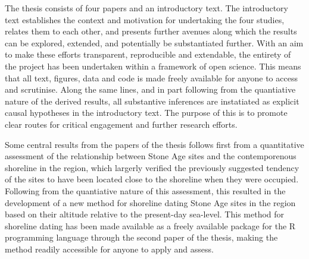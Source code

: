 The thesis consists of four papers and an introductory text. The introductory text establishes the context and motivation for undertaking the four studies, relates them to each other, and presents further avenues along which the results can be explored, extended, and potentially be substantiated further. With an aim to make these efforts transparent, reproducible and extendable, the entirety of the project has been undertaken within a framework of open science. This means that all text, figures, data and code is made freely available for anyone to access and scrutinise. Along the same lines, and in part following from the quantiative nature of the derived results, all substantive inferences are instatiated as explicit causal hypotheses in the introductory text. The purpose of this is to promote clear routes for critical engagement and further research efforts.  

Some central results from the papers of the thesis follows first from a quantitative assessment of the relationship between Stone Age sites and the contemporenous shoreline in the region, which largerly verified the previously suggested tendency of the sites to have been located close to the shoreline when they were occupied. Following from the quantiative nature of this assessment, this resulted in the development of a new method for shoreline dating Stone Age sites in the region based on their altitude relative to the present-day sea-level. This method for shoreline dating has been made available as a freely available package for the R programming language through the second paper of the thesis, making the method readily accessible for anyone to apply and assess. 

